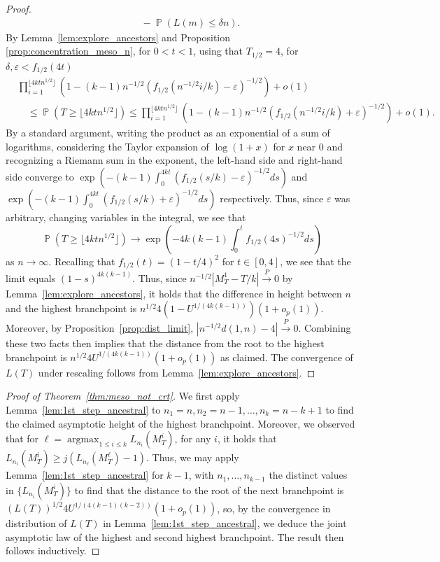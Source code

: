 \documentclass[letterpaper,11pt,reqno]{amsart}
\theoremstyle{definition}
\renewcommand{\le}{\leqslant}
\renewcommand{\ge}{\geqslant}
\newcommand{\eps}{\varepsilon}
\DeclareMathOperator{\pr}{\mathds{P}}
\DeclareMathOperator{\argmax}{argmax}
\newcommand{\convp}{\stackrel{P}{\longrightarrow}}
\begin{document}
{\begin{proof}
\begin{align*}
&\quad -\pr(L(m)\le \delta n).\end{align*}
By Lemma~\ref{lem:explore_ancestors} and Proposition \ref{prop:concentration_meso_n}, for $0<t<1$, using that $T_{1/2}=4$, for   $\delta,\varepsilon<f_{1/2}(4t)$
\begin{align*}&\prod_{i=1}^{\lfloor 4k t n^{1/2}\rfloor}(1-(k-1)n^{-1/2} (f_{1/2}(n^{-1/2} i/k)-\eps)^{-1/2} )+o(1)\\&\quad \le  \pr(T\ge \lfloor 4kt n^{1/2}\rfloor)\le\prod_{i=1}^{\lfloor 4k t n^{1/2}\rfloor}(1-(k-1)n^{-1/2} (f_{1/2}(n^{-1/2} i/k)+\eps)^{-1/2} )+o(1) .\end{align*}
By a standard argument, writing the product as an exponential of a sum of logarithms, considering the Taylor expansion of $\log(1+x)$ for $x$ near $0$ and recognizing a Riemann sum in the exponent, the left-hand side and right-hand side converge to 
$\exp(-(k-1)\int_{0}^{4kt}(f_{1/2}(s/k)-\varepsilon)^{-1/2} ds) $ and $\exp(-(k-1)\int_{0}^{4kt}(f_{1/2}(s/k)+\varepsilon)^{-1/2} ds)$ respectively. Thus, since $\varepsilon$ was arbitrary, changing variables in the integral, we see that \[\pr(T\ge \lfloor 4kt n^{1/2}\rfloor)\to \exp\left(-4k(k-1)\int_{0}^tf_{1/2}(4s)^{-1/2} ds\right) \] 
as $n\to \infty$. Recalling that 
$f_{1/2}(t)=(1-t/4)^2$ for $t\in[0,4]$, we see that the limit equals $(1-s)^{4k(k-1)}$. Thus, since $n^{-1/2}|M^1_T-T/k|\convp 0$ by Lemma~\ref{lem:explore_ancestors}, it holds that the difference in height between $n$ and the highest branchpoint is $n^{1/2}4(1-U^{1/(4k(k-1))})(1+o_p(1))$. Moreover, by Proposition~\ref{prop:dist_limit}, $|n^{-1/2}d(1,n)-4|\convp 0$. Combining these two facts then implies that the distance from the root to the highest branchpoint is $n^{1/2}4U^{1/(4k(k-1))}(1+o_p(1))$ as claimed.  The convergence of $L(T)$ under rescaling  follows from Lemma~\ref{lem:explore_ancestors}. \qedhere \end{proof}

\begin{proof}[Proof of Theorem~\ref{thm:meso_not_crt}]
We first apply Lemma~\ref{lem:1st_step_ancestral} to $n_1=n, n_2=n-1,\dots, n_k=n-k+1$ to find the claimed asymptotic height of the highest branchpoint. Moreover, we observed that for $\ell=\argmax_{1\le i \le k} L_{n_i}(M^i_T)$, for any $i$, it holds that $L_{n_i}(M^i_T)\ge j(L_{n_\ell}(M^\ell_T)-1)$. Thus, we may apply Lemma~\ref{lem:1st_step_ancestral} for $k-1$, with $n_1,\dots, n_{k-1}$ the distinct values in $\{L_{n_i}(M^i_T)\}$ to find that the distance to the root of the next branchpoint is $(L(T))^{1/2}4U^{1/(4(k-1)(k-2))}(1+o_p(1))$, so, by the convergence in distribution of $L(T)$ in Lemma~\ref{lem:1st_step_ancestral}, we deduce the joint asymptotic law of the highest and second highest branchpoint. The result then follows inductively. \end{proof}


}
\end{document}
